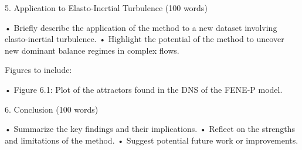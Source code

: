 5. Application to Elasto-Inertial Turbulence (100 words)

	•	Briefly describe the application of the method to a new dataset involving elasto-inertial turbulence.
	•	Highlight the potential of the method to uncover new dominant balance regimes in complex flows.

Figures to include:

	•	Figure 6.1: Plot of the attractors found in the DNS of the FENE-P model.

6. Conclusion (100 words)

	•	Summarize the key findings and their implications.
	•	Reflect on the strengths and limitations of the method.
	•	Suggest potential future work or improvements.
